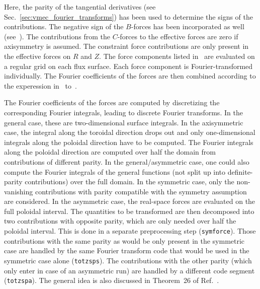 Here, the parity of the tangential derivatives (see Sec.~\ref{sec:vmec_fourier_transforms})
has been used to determine the signs of the contributions.
The negative sign of the $B$-forces has been incorporated as well (see~).
The contributions from the $C$-forces to the effective forces are zero if axisymmetry is assumed.
The constraint force contributions are only present in the effective forces on $R$ and $Z$.
The force components listed in~ are evaluated on a regular grid on each flux surface.
Each force component is Fourier-transformed individually.
The Fourier coefficients of the forces are then combined according to the experession in~ to~.

The Fourier coefficients of the forces are computed by discretizing the corresponding Fourier integrals,
leading to discrete Fourier transforms.
In the general case, these are two-dimensional surface integrals.
In the axisymmetric case, the integral along the toroidal direction drops out
and only one-dimensional integrals along the poloidal direction have to be computed.
The Fourier integrals along the poloidal direction are computed over half the domain from contributions of different parity.
In the general/asymmetric case, one could also compute the Fourier integrals of the general functions
(not split up into definite-parity contributions) over the full domain.
In the symmetric case, only the non-vanishing contributions with parity compatible with the symmetry assumption are considered.
In the asymmetric case, the real-space forces are evaluated on the full poloidal interval.
The quantities to be transformed are then decomposed into two contributions with opposite parity,
which are only needed over half the poloidal interval.
This is done in a separate preprocessing step (\texttt{symforce}).
Those contributions with the same parity as would be only present in the symmetric case
are handled by the same Fourier transform code that would be used in the symmetric case alone (\texttt{totzsps}).
The contributions with the other parity (which only enter in case of an asymmetric run)
are handled by a different code segment (\texttt{totzspa}).
The general idea is also discussed in Theorem~26 of Ref.~\cite{boyd_spectral_methods}.

